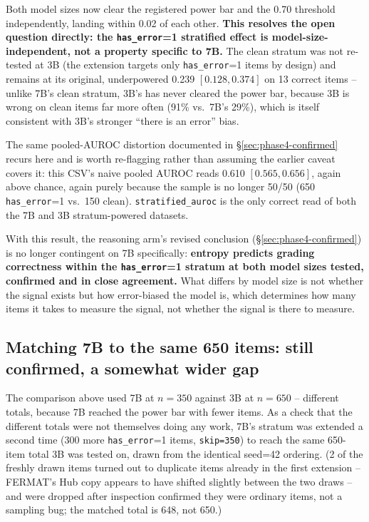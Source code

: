 \documentclass[11pt]{article}
\begin{document}
Both model sizes now clear the registered power bar and the 0.70 threshold
independently, landing within 0.02 of each other. \textbf{This resolves the
open question directly: the \texttt{has\_error}=1 stratified effect is
model-size-independent, not a property specific to 7B.} The clean stratum
was not re-tested at 3B (the extension targets only
\texttt{has\_error}=1 items by design) and remains at its original,
underpowered 0.239 $[0.128, 0.374]$ on 13 correct items -- unlike 7B's
clean stratum, 3B's has never cleared the power bar, because 3B is wrong on
clean items far more often (91\% vs.\ 7B's 29\%), which is itself consistent
with 3B's stronger ``there is an error'' bias.

The same pooled-AUROC distortion documented in \S\ref{sec:phase4-confirmed}
recurs here and is worth re-flagging rather than assuming the earlier
caveat covers it: this CSV's naive pooled AUROC reads 0.610 $[0.565,
0.656]$, again above chance, again purely because the sample is no longer
50/50 (650 \texttt{has\_error}=1 vs.\ 150 clean). \texttt{stratified\_auroc}
is the only correct read of both the 7B and 3B stratum-powered datasets.

With this result, the reasoning arm's revised conclusion
(\S\ref{sec:phase4-confirmed}) is no longer contingent on 7B specifically:
\textbf{entropy predicts grading correctness within the
\texttt{has\_error}=1 stratum at both model sizes tested, confirmed and in
close agreement.} What differs by model size is not whether the signal
exists but how error-biased the model is, which determines how many items
it takes to measure the signal, not whether the signal is there to measure.

\subsection{Matching 7B to the same 650 items: still confirmed, a somewhat
wider gap}
\label{sec:phase4-matched}

The comparison above used 7B at $n=350$ against 3B at $n=650$ -- different
totals, because 7B reached the power bar with fewer items. As a check that
the different totals were not themselves doing any work, 7B's stratum was
extended a second time (300 more \texttt{has\_error}=1 items, \texttt{skip=350})
to reach the same 650-item total 3B was tested on, drawn from the identical
seed=42 ordering. (2 of the freshly drawn items turned out to duplicate
items already in the first extension -- FERMAT's Hub copy appears to have
shifted slightly between the two draws -- and were dropped after inspection
confirmed they were ordinary items, not a sampling bug; the matched total is
648, not 650.)
\end{document}
